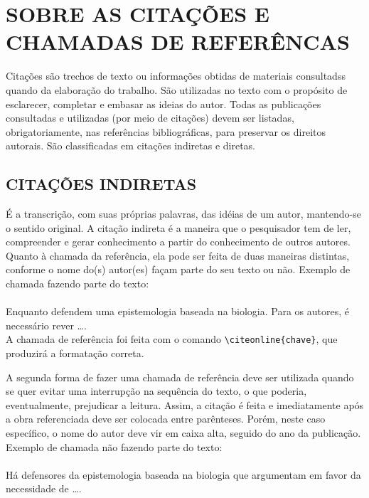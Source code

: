 \section{SOBRE AS CITAÇÕES E CHAMADAS DE REFERÊNCAS}
\label{sec:apSobreCita}

Citações são trechos de texto ou informações obtidas de materiais consultadss quando da elaboração do trabalho. São utilizadas no texto com o propósito de esclarecer, completar e embasar as ideias do autor. Todas as publicações consultadas e utilizadas (por meio de citações) devem ser listadas, obrigatoriamente, nas referências bibliográficas, para preservar os direitos autorais. São classificadas em citações indiretas e diretas.

\subsection{CITAÇÕES INDIRETAS}
\label{subsec:citacoesLivres}

É a transcrição, com suas próprias palavras, das idéias de um autor, mantendo-se o sentido original. A citação indireta é a maneira que o pesquisador tem de ler, compreender e gerar conhecimento a partir do conhecimento de outros autores. Quanto à chamada da referência, ela pode ser feita de duas maneiras distintas, conforme o nome do(s) autor(es) façam parte do seu texto ou não. Exemplo de chamada fazendo parte do texto:\\
\\Enquanto {} defendem uma epistemologia baseada na biologia. Para os autores, é necessário rever \ldots.\\

A chamada de referência foi feita com o comando \verb|\citeonline{chave}|, que produzirá a formatação correta.

A segunda forma de fazer uma chamada de referência deve ser utilizada quando se quer evitar uma interrupção na sequência do texto, o que poderia, eventualmente, prejudicar a leitura. Assim, a citação é feita e imediatamente após a obra referenciada deve ser colocada entre parênteses. Porém, neste caso específico, o nome do autor deve vir em caixa alta, seguido do ano da publicação. Exemplo de chamada não fazendo parte do texto:\\
\\Há defensores da epistemologia baseada na biologia que argumentam em favor da necessidade de \ldots \cite{Maturana2003}.\\

